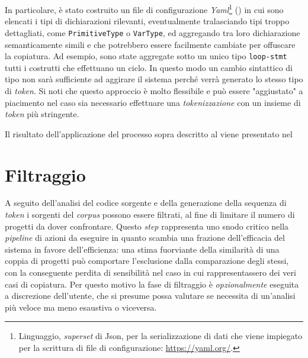 In particolare, è stato costruito un file di configurazione \textit{Yaml}\footnote{Linguaggio, \textit{superset} di Json, per la serializzazione di dati che viene impiegato per la scrittura di file di configurazione: \url{https://yaml.org/}.} () in cui sono elencati i tipi di dichiarazioni rilevanti, eventualmente tralasciando tipi troppo dettagliati, come \texttt{PrimitiveType} o \texttt{VarType}, ed aggregando tra loro dichiarazione semanticamente simili e che potrebbero essere facilmente cambiate per offuscare la copiatura.
%
Ad esempio, sono state aggregate sotto un unico tipo \texttt{loop-stmt} tutti i costrutti che effettuano un ciclo.
%
In questo modo un cambio sintattico di tipo non sarà sufficiente ad aggirare il sistema perché verrà generato lo stesso tipo di \textit{token}.
%
Si noti che questo approccio è molto flessibile e può essere "aggiustato" a piacimento nel caso sia necessario effettuare una \textit{tokenizzazione} con un insieme di \textit{token} più stringente.



Il risultato dell'applicazione del processo sopra descritto al  viene presentato nel 




\section{Filtraggio}
\label{03:filtering-phase}
A seguito dell'analisi del codice sorgente e della generazione della sequenza di \textit{token} i sorgenti del \textit{corpus} possono essere filtrati, al fine di limitare il numero di progetti da dover confrontare.
%
Questo \textit{step} rappresenta uno snodo critico nella \textit{pipeline} di azioni da eseguire in quanto scambia una frazione dell'efficacia del sistema in favore dell'efficienza: una stima fuorviante della similarità di una coppia di progetti può comportare l'esclusione dalla comparazione degli stessi, con la conseguente perdita di sensibilità nel caso in cui rappresentassero dei veri casi di copiatura.
%
Per questo motivo la fase di filtraggio è \textit{opzionalmente} eseguita a discrezione dell'utente, che si presume possa valutare se necessita di un'analisi più veloce ma meno esaustiva o viceversa.

